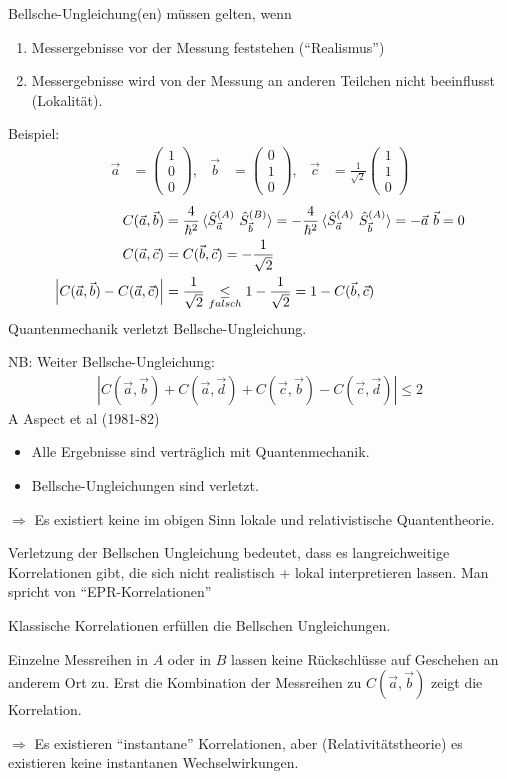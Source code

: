 	Bellsche-Ungleichung(en) müssen gelten, wenn
		\begin{enumerate}[1.]
			\item Messergebnisse vor der Messung feststehen (``Realismus'')
			\item Messergebnisse wird von der Messung an anderen Teilchen nicht beeinflusst (Lokalität).
		\end{enumerate} 
	Beispiel:
		\begin{align*}
			\vec{a} &= 
			\begin{pmatrix}
			1 \\ 0 \\ 0
			\end{pmatrix},&
			\vec{b} &= 
			\begin{pmatrix}
			0 \\ 1 \\ 0
			\end{pmatrix},&
			\vec{c} &= \frac{1}{\sqrt{2}}
			\begin{pmatrix}
			1 \\ 1 \\ 0
			\end{pmatrix}
		\end{align*}
		\begin{align*}
			C(\vec{a}, \vec{b}) &= \frac{4}{\hbar^2} \braket{\hat{S}_{\vec{a}}^{(A)}~ \hat{S}_{\vec{b}}^{(B)}} = -\frac{4}{\hbar^2} \braket{\hat{S}_{\vec{a}}^{(A)}~\hat{S}_{\vec{b}}^{(A)}} 
			= - \vec{a} ~\vec{b} = 0 \\
			C(\vec{a}, \vec{c}) &= C(\vec{b}, \vec{c}) = - \frac{1}{\sqrt{2}} \\ 
			\left|C(\vec{a}, \vec{b}) - C(\vec{a}, \vec{c})\right| &= 
			\frac{1}{\sqrt{2}} \underset{falsch}{\leq} 1 - \frac{1}{\sqrt{2}} = 1 - C(\vec{b}, \vec{c})
		\end{align*}
	Quantenmechanik verletzt Bellsche-Ungleichung.
	
	NB: Weiter Bellsche-Ungleichung:
		\begin{align*}
			\left|C(\vec{a}, \vec{b}) + C(\vec{a}, \vec{d}) + C(\vec{c}, \vec{b}) - C(\vec{c}, \vec{d})\right| \leq 2
		\end{align*}
	A Aspect et al (1981-82) 
		\begin{itemize}
			\item Alle Ergebnisse sind verträglich mit Quantenmechanik. 
			\item Bellsche-Ungleichungen sind verletzt.
		\end{itemize}
	$\Rightarrow$ Es existiert keine im obigen Sinn lokale und relativistische Quantentheorie.
	
	Verletzung der Bellschen Ungleichung bedeutet, dass es langreichweitige Korrelationen gibt, die sich nicht realistisch + lokal interpretieren lassen. Man spricht von ``EPR-Korrelationen''
	
	Klassische Korrelationen erfüllen die Bellschen Ungleichungen.
	
	Einzelne Messreihen in $A$ oder in $B$ lassen keine Rückschlüsse auf Geschehen an anderem Ort zu. Erst die Kombination der Messreihen zu $C (\vec{a}, \vec{b})$
	zeigt die Korrelation.
	
	$\Rightarrow$ Es existieren ``instantane'' Korrelationen, aber (Relativitätstheorie) es existieren keine instantanen Wechselwirkungen.